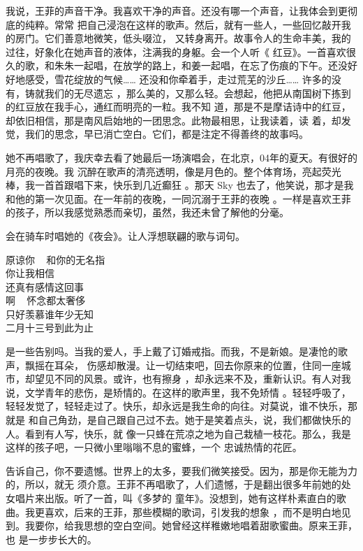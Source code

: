 \documentclass[12pt,a4paper]{article}
\begin{document}
		我说，王菲的声音干净。我喜欢干净的声音。还没有哪一个声音，让我体会到更彻底的纯粹。常常
	把自己浸泡在这样的歌声。然后，就有一些人，一些回忆敲开我的房门。它们善意地微笑，低头啜泣，
	又转身离开。故事令人的生命丰美，我的过往，好象化在她声音的液体，注满我的身躯。会一个人听《
	红豆》。一首喜欢很久的歌，和朱朱一起唱，在放学的路上，和姜一起唱，在忘了伤痕的下午。还没好
	好地感受，雪花绽放的气候…… 还没和你牵着手，走过荒芜的沙丘…… 许多的没有，铸就我们的无尽遗忘
	，那么美的，又那么轻。会想起，他把从南国树下拣到的红豆放在我手心，通红而明亮的一粒。我不知
	道，那是不是摩诘诗中的红豆，却依旧相信，那是南风启始地的一团思念。此物最相思，让我读着，读
	着，却发觉，我们的思念，早已消亡空白。它们，都是注定不得善终的故事吗。

		她不再唱歌了，我庆幸去看了她最后一场演唱会，在北京，04年的夏天。有很好的月亮的夜晚。我
	沉醉在歌声的清亮透明，像是月色的。整个体育场，亮起荧光棒，我一首首跟唱下来，快乐到几近癫狂
	。那天 Sky 也去了，他笑说，那才是我和他的第一次见面。在一年前的夜晚，一同沉溺于王菲的夜晚
	。一样是喜欢王菲的孩子，所以我感觉熟悉而亲切，虽然，我还未曾了解他的分毫。

		会在骑车时唱她的《夜会》。让人浮想联翩的歌与词句。

		\longpoem{}{}{}
		原谅你 ~ 和你的无名指 \\
		你让我相信 \\
		还真有感情这回事 \\
		啊 ~ 怀念都太奢侈 \\
		只好羡慕谁年少无知 \\
		二月十三号到此为止
		\endlongpoem


		是一些告别吗。当我的爱人，手上戴了订婚戒指。而我，不是新娘。是凄怆的歌声，飘摇在耳朵，
	伤感却散漫。让一切结束吧，回去你原来的位置，住同一座城市，却望见不同的风景。或许，也有擦身
	，却永远来不及，重新认识。有人对我说，文学青年的悲伤，是矫情的。在这样的歌声里，我不免矫情
	。轻轻呼吸了，轻轻发觉了，轻轻走过了。快乐，却永远是我生命的向往。对莫说，谁不快乐，那就是
	和自己角劲，是自己跟自己过不去。她于是笑着点头，说，我们都做快乐的人。看到有人写，快乐，就
	像一只蜂在荒凉之地为自己栽植一枝花。那么，我是这样的孩子吧，一只微小里嗡嗡不息的蜜蜂，一个
	忠诚热情的花匠。


		告诉自己，你不要遗憾。世界上的太多，要我们微笑接受。因为，那是你无能为力的，所以，就无
	须介意。王菲不再唱歌了，人们遗憾，于是翻出很多年前她的处女唱片来出版。听了一首，叫《多梦的
	童年》。没想到，她有这样朴素直白的歌曲。我更喜欢，后来的王菲，那些模糊的歌词，引发我的想象
	，而不是明白地见到。我要你，给我思想的空白空间。她曾经这样稚嫩地唱着甜歌蜜曲。原来王菲，也
	是一步步长大的。
\end{document}
